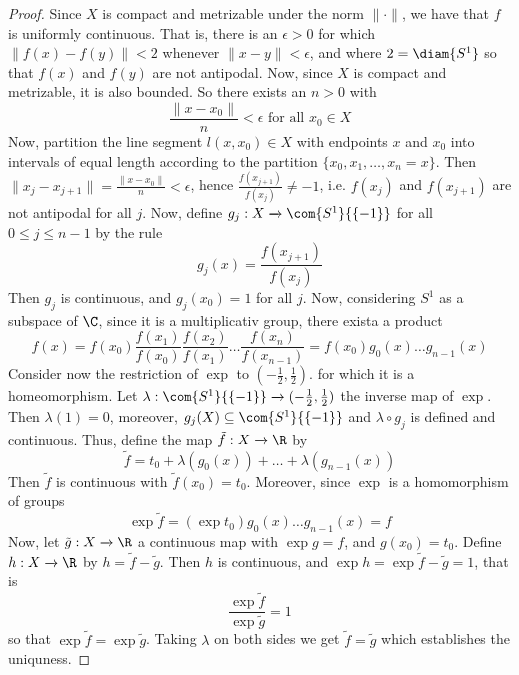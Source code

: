 \begin{proof}
    Since $X$ is compact and metrizable under the norm $\|\cdot\|$, we have
    that $f$ is uniformly continuous. That is, there is an $\epsilon>0$ for
    which  $\|f(x)-f(y)\|<2$ whenever $\|x-y\|<\epsilon$, and where  $2=\diam{S^1}$
    so that $f(x)$ and $f(y)$ are not antipodal. Now, since $X$ is compact and
    metrizable, it is also bounded. So there exists an $n>0$ with
    \begin{equation*}
        \frac{\|x-x_0\|}{n}<\epsilon \text{ for all } x_0 \in X
    \end{equation*}
    Now, partition the line segment $l(x,x_0) \in X$ with endpoints $x$ and
    $x_0$ into intervals of equal length according to the partition $\{x_0, x_1,
    \dots ,x_n=x\}$. Then $\|x_j-x_{j+1}\|=\frac{\|x-x_0\|}{n}<\epsilon$, hence
    $\frac{f(x_{j+1})}{f(x_j)} \neq -1$, i.e. $f(x_j)$ and $f(x_{j+1})$ are not
    antipodal for all $j$. Now, define  $g_j:X \xrightarrow{} \com{S^1}{\{-1\}}$
    for all $0 \leq j \leq n-1$ by the rule
    \begin{equation*}
        g_j(x)=\frac{f(x_{j+1})}{f(x_j)}
    \end{equation*}
    Then $g_j$ is continuous, and  $g_j(x_0)=1$ for all $j$. Now, considering
    $S^1$ as a subspace of  $\C$, since it is a multiplicativ group, there
    exista a product
    \begin{equation*}
        f(x)=f(x_0)\frac{f(x_1)}{f(x_0)}\frac{f(x_2)}{f(x_1)} \dots
        \frac{f(x_n)}{f(x_{n-1})}=f(x_0)g_0(x) \dots g_{n-1}(x)
    \end{equation*}
    Consider now the restriction of $\exp$ to  $(-\frac{1}{2},\frac{1}{2})$. for
    which it is a homeomorphism. Let $\lambda:\com{S^1}{\{-1\}} \xrightarrow{}
    (-\frac{1}{2},\frac{1}{2})$ the inverse map of $\exp$. Then  $\lambda(1)=0$,
    moreover, $g_j(X) \subseteq \com{S^1}{\{-1\}}$ and $\lambda \circ g_j$ is
    defined and continuous. Thus, define the map $\tilde{f}:X \xrightarrow{} \R$
    by
    \begin{equation*}
        \tilde{f}=t_0+\lambda(g_0(x))+\dots+\lambda(g_{n-1}(x))
    \end{equation*}
    Then $\tilde{f}$ is continuous with $\tilde{f}(x_0)=t_0$. Moreover, since
    $\exp$ is a homomorphism of groups
    \begin{equation*}
        \exp{\tilde{f}}=(\exp{t_0})g_0(x) \dots g_{n-1}(x)=f
    \end{equation*}
    Now, let $\tilde{g}:X \xrightarrow{} \R$ a continuous map with $\exp{g}=f$,
    and $g(x_0)=t_0$. Define $h:X \xrightarrow{} \R$ by $h=\tilde{f}-\tilde{g}$.
    Then $h$ is continuous, and  $\exp{h}=\exp{\tilde{f}-\tilde{g}}=1$, that is
    \begin{equation*}
        \frac{\exp{\tilde{f}}}{\exp{\tilde{g}}}=1
    \end{equation*}
    so that $\exp{\tilde{f}}=\exp{\tilde{g}}$. Taking $\lambda$ on both sides we
    get  $\tilde{f}=\tilde{g}$ which establishes the uniquness.
\end{proof}
